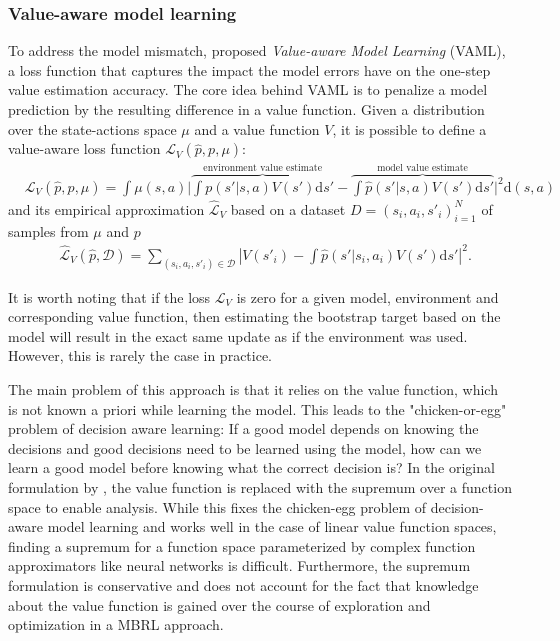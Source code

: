 \subsubsection{Value-aware model learning}

To address the model mismatch, \parencite{vaml} proposed \emph{Value-aware Model Learning} (VAML), a loss function that captures the impact the model errors have on the one-step value estimation accuracy.
The core idea behind VAML is to penalize a model prediction by the resulting difference in a value function. Given a distribution over the state-actions space $\mu$ and a value function $V$, it is possible to define a value-aware loss function $\mathcal{L}_V(\hat{p}, p, \mu)$:
\begin{align}
    &\mathcal{L}_V(\hat{p}, p, \mu) = \int \mu(s,a) \bigg|\overbrace{\int p(s'|s,a)V(s')\mathrm{d}s'}^{\text{environment value estimate}}  - \overbrace{\int \hat{p}(s'|s,a) V(s') \mathrm{d}s'}^{\text{model value estimate}}\bigg|^2 \mathrm{d} (s,a)
    \end{align}
    and its empirical approximation $\hat{\mathcal{L}}_V$ based on a dataset $D = (s_i,a_i,s'_i)_{i=1}^N$ of samples from $\mu$ and $p$
    \begin{align}
    &\hat{\mathcal{L}}_V(\hat{p}, \mathcal{D}) = \sum_{(s_i,a_i,s'_i)\in\mathcal{D}} \left|V(s'_i) - \int \hat{p}(s'|s_i,a_i) V(s') \mathrm{d} s'\right|^2\label{IterVAMLloss}.
\end{align}

It is worth noting that if the loss $\mathcal{L}_V$ is zero for a given model, environment and corresponding value function, then estimating the bootstrap target based on the model will result in the exact same update as if the environment was used. However, this is rarely the case in practice.

The main problem of this approach is that it relies on the value function, which is not known a priori while learning the model. 
This leads to the "chicken-or-egg" problem of decision aware learning: If a good model depends on knowing the decisions and good decisions need to be learned using the model, how can we learn a good model before knowing what the correct decision is?
In the original formulation by \textcite{vaml}, the value function is replaced with the supremum over a function space to enable analysis.
While this fixes the chicken-egg problem of decision-aware model learning and works well in the case of linear value function spaces, finding a supremum for a function space parameterized by complex function approximators like neural networks is difficult.
Furthermore, the supremum formulation is conservative and does not account for the fact that knowledge about the value function is gained over the course of exploration and optimization in a MBRL approach.


